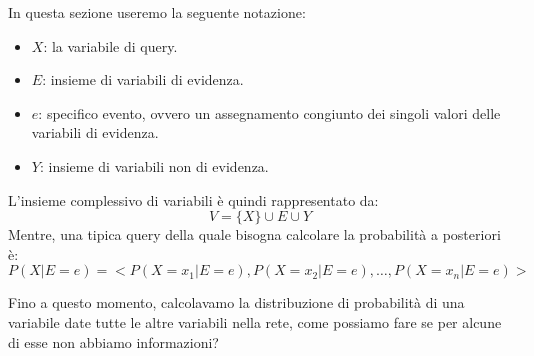 In questa sezione useremo la seguente notazione:
\begin{itemize}
    \item $X$: la variabile di query.
    \item $E$: insieme di variabili di evidenza.
    \item $e$: specifico evento, ovvero un assegnamento congiunto dei singoli
          valori delle variabili di evidenza.
    \item $Y$: insieme di variabili non di evidenza.
\end{itemize}
L'insieme complessivo di variabili è quindi rappresentato da:
\begin{equation*}
    V = \{X\} \cup E \cup Y
\end{equation*}
Mentre, una tipica query della quale bisogna calcolare la probabilità a
posteriori è:
\begin{equation*}
    P(X|E=e) = <P(X=x_1|E=e), P(X=x_2|E=e), \dots, P(X=x_n|E=e)>
\end{equation*}

Fino a questo momento, calcolavamo la distribuzione di probabilità di una
variabile date tutte le altre variabili nella rete, come possiamo fare se per
alcune di esse non abbiamo informazioni?

